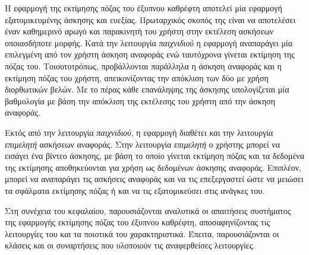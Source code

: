 Η εφαρμογή της εκτίμησης πόζας του έξυπνου καθρέφτη αποτελεί μία εφαρμογή εξατομικευμένης άσκησης και ευεξίας. Πρωταρχικός σκοπός της είναι να αποτελέσει έναν καθημερινό αρωγό και παρακινητή του χρήστη στην εκτέλεση ασκήσεων οποιασδήποτε μορφής. Κατά την λειτουργία \textsl{παιχνιδιού} η εφαρμογή αναπαράγει μία επιλεγμένη από τον χρήστη άσκηση αναφοράς ενώ ταυτόχρονα γίνεται εκτίμηση της πόζας του. Τοιουτοτρόπως, προβάλλονται παράλληλα η άσκηση αναφοράς και η εκτίμηση πόζας του χρήστη, απεικονίζοντας την απόκλιση των δύο με χρήση διορθωτικών βελών. Με το πέρας κάθε επανάληψης της άσκησης υπολογίζεται μία βαθμολογία με βάση την απόκλιση της εκτέλεσης του χρήστη από την άσκηση αναφοράς.

Εκτός από την λειτουργία \textsl{παιχνιδιού}, η εφαρμογή διαθέτει και την λειτουργία \textsl{επιμελητή} ασκήσεων αναφοράς. Στην λειτουργία \textsl{επιμελητή} ο χρήστης μπορεί να εισάγει ένα βίντεο άσκησης, με βάση το οποίο γίνεται εκτίμηση πόζας και τα δεδομένα της εκτίμησης αποθηκεύονται για χρήση ως δεδομένων άσκησης αναφοράς. Επιπλέον, μπορεί να αναπαράγει τις ασκήσεις αναφοράς και να τις επεξεργαστεί ώστε να μειώσει τα σφάλματα εκτίμησης πόζας ή και να τις εξατομικεύσει στις ανάγκες του.

Στη συνέχεια του κεφαλαίου, παρουσιάζονται αναλυτικά οι απαιτήσεις συστήματος της εφαρμογής εκτίμησης πόζας του έξυπνου καθρέφτη, αποσαφηνίζοντας τις λειτουργίες του και τα ποιοτικά του χαρακτηριστικά. Έπειτα, παρουσιάζονται οι κλάσεις και οι συναρτήσεις που υλοποιούν τις αναφερθείσες λειτουργίες.